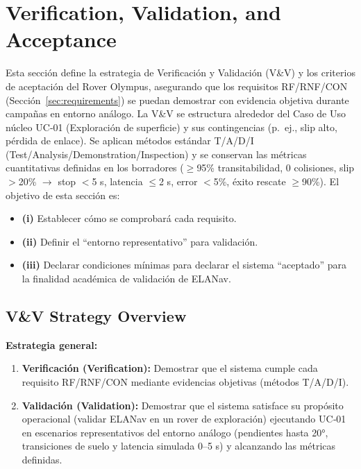 
\section{Verification, Validation, and Acceptance}\label{sec:vv}

Esta sección define la estrategia de Verificación y Validación (V\&V) y los criterios de aceptación del Rover Olympus, asegurando que los requisitos RF/RNF/CON (Sección~\ref{sec:requirements}) se puedan demostrar con evidencia objetiva durante campañas en entorno análogo. \cite{nasa_cm, segoldmine_ppi, omg_sysml_mbse}  
La V\&V se estructura alrededor del Caso de Uso núcleo UC‑01 (Exploración de superficie) y sus contingencias (p.~ej., slip alto, pérdida de enlace). Se aplican métodos estándar T/A/D/I (Test/\allowbreak Analysis/\allowbreak Demonstration/\allowbreak Inspection) y se conservan las métricas cuantitativas definidas en los borradores ($\ge$95\% transitabilidad, 0 colisiones, slip $>$20\% $\rightarrow$ stop $<$5 s, latencia $\le$2 s, error $<$5\%, éxito rescate $\ge$90\%). \cite{nasa_cm, segoldmine_ppi, omg_sysml_mbse}  
El objetivo de esta sección es:
\begin{itemize}
    \item \textbf{(i)} Establecer cómo se comprobará cada requisito.
    \item \textbf{(ii)} Definir el ``entorno representativo'' para validación.
    \item \textbf{(iii)} Declarar condiciones mínimas para declarar el sistema ``aceptado'' para la finalidad académica de validación de ELANav. \cite{nasa_cm, segoldmine_ppi, omg_sysml_mbse}
\end{itemize}

\subsection{V\&V Strategy Overview}

\textbf{Estrategia general:}
\begin{enumerate}
    \item \textbf{Verificación (Verification):} Demostrar que el sistema cumple cada requisito RF/RNF/CON mediante evidencias objetivas (métodos T/A/D/I). \cite{nasa_cm, segoldmine_ppi, omg_sysml_mbse}  
    \item \textbf{Validación (Validation):} Demostrar que el sistema satisface su propósito operacional (validar ELANav en un rover de exploración) ejecutando UC‑01 en escenarios representativos del entorno análogo (pendientes hasta 20°, transiciones de suelo y latencia simulada 0–5 s) y alcanzando las métricas definidas. \cite{nasa_cm, segoldmine_ppi, omg_sysml_mbse}  
\end{enumerate}

